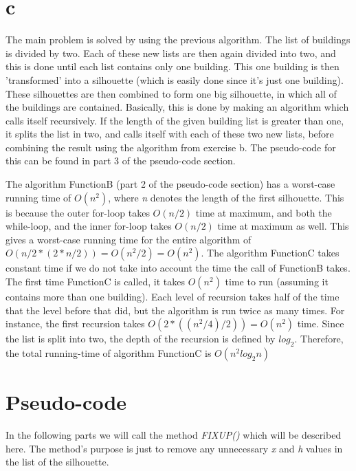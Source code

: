 \documentclass[a4paper,oneside,article,11pt]{memoir}
\begin{document}
\chapter*{c}
The main problem is solved by using the previous algorithm. The list of buildings is divided by two. Each of these new lists are then again divided into two, and this is done until each list contains only one building. This one building is then 'transformed' into a silhouette (which is easily done since it's just one building). These silhouettes are then combined to form one big silhouette, in which all of the buildings are contained. Basically, this is done by making an algorithm which calls itself recursively. If the length of the given building list is greater than one, it splits the list in two, and calls itself with each of these two new lists, before combining the result using the algorithm from exercise b. The pseudo-code for this can be found in part 3 of the pseudo-code section.

The algorithm FunctionB (part 2 of the pseudo-code section) has a worst-case running time of $O(n^2)$, where \emph{n} denotes the length of the first silhouette. This is because the outer for-loop takes $O(n/2)$ time at maximum, and both the while-loop, and the inner for-loop takes $O(n/2)$ time at maximum as well. This gives a worst-case running time for the entire algorithm of $O(n/2*(2*n/2)) = O(n^2/2) = O(n^2)$. The algorithm FunctionC takes constant time if we do not take into account the time the call of FunctionB takes. The first time FunctionC is called, it takes $O(n^2)$ time to run (assuming it contains more than one building). Each level of recursion takes half of the time that the level before that did, but the algorithm is run twice as many times. For instance, the first recursion takes $O(2*((n^2 /4)/2)) = O(n^2)$ time. Since the list is split into two, the depth of the recursion is defined by $log_2$. Therefore, the total running-time of algorithm FunctionC is $O(n^2log_2n)$


\chapter*{Pseudo-code}
In the following parts we will call the method \emph{FIXUP()} which will be described here.
The method's purpose is just to remove any unnecessary \emph{x} and \emph{h} values in the list of the silhouette.
\end{document}
